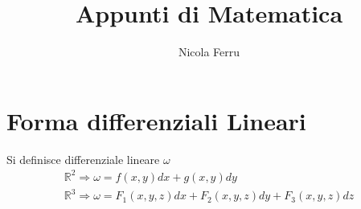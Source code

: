 \documentclass{book}
\title{Appunti di Matematica}
\author{Nicola Ferru}
\date{}
\begin{document}


\tableofcontents
\listoffigures







\section{Forma differenziali Lineari}
Si definisce differenziale lineare $\omega$
\begin{align*}
	\mathds{R}^2\Rightarrow \omega=f(x,y)dx+g(x,y)dy\\
	\mathds{R}^3\Rightarrow \omega= F_1(x,y,z)dx+F_2(x,y,z)dy+F_3(x,y,z)dz
\end{align*}
\end{document}
